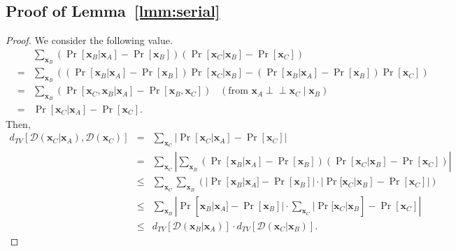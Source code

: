 \documentclass[letterpaper,11pt]{article}
\newcommand{\dtv}{d_{TV}}
\newcommand{\cald}{\mathcal{D}}
\newcommand{\bfx}{\mathbf{x}}
\newcommand{\ci}{\perp\!\!\!\perp}
\begin{document}
\subsection{Proof of Lemma~\ref{lmm:serial}}
\begin{proof}
  We consider the following value.
  \begin{eqnarray*}
    &&
    \sum_{\bfx_B}(\Pr[\bfx_B|\bfx_A]-\Pr[\bfx_B])(\Pr[\bfx_C|\bfx_B]-\Pr[\bfx_C])\\
    &=&
    \sum_{\bfx_B}\left((\Pr[\bfx_B|\bfx_A]-\Pr[\bfx_B])\Pr[\bfx_C|\bfx_B]-(\Pr[\bfx_B|\bfx_A]-\Pr[\bfx_B])\Pr[\bfx_C]\right)\\
    &=&
    \sum_{\bfx_B}\left(\Pr[\bfx_C,\bfx_B|\bfx_A]-\Pr[\bfx_B,\bfx_C]\right)\;\;\;(\mbox{from }\bfx_A\ci\bfx_C\mid\bfx_B)\\
    &=&
    \Pr[\bfx_C|\bfx_A]-\Pr[\bfx_C].
  \end{eqnarray*}
  Then,
  \begin{eqnarray*}
    \dtv[\cald(\bfx_C|\bfx_A),\cald(\bfx_C)]
    &=&
    \sum_{\bfx_C}\left|\Pr[\bfx_C|\bfx_A]-\Pr[\bfx_C]\right|\\
    &=&
    \sum_{\bfx_C}\left|\sum_{\bfx_B}(\Pr[\bfx_B|\bfx_A]-\Pr[\bfx_B])(\Pr[\bfx_C|\bfx_B]-\Pr[\bfx_C])\right|\\
    &\leq&
    \sum_{\bfx_C}\sum_{\bfx_B}\left(|\Pr[\bfx_B|\bfx_A]-\Pr[\bfx_B]|\cdot |\Pr[\bfx_C|\bfx_B]-\Pr[\bfx_C]|\right)\\
    &\leq&
    \sum_{\bfx_B}|\Pr[\bfx_B|\bfx_A]-\Pr[\bfx_B]|\cdot \sum_{\bfx_C}|\Pr[\bfx_C|\bfx_B]-\Pr[\bfx_C]|\\
    &\leq&
    \dtv[\cald(\bfx_B|\bfx_A)]\cdot \dtv[\cald(\bfx_C|\bfx_B)].
  \end{eqnarray*}
\end{proof}
\end{document}
